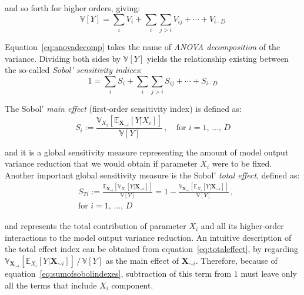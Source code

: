 \noindent
and so forth for higher orders, giving:
%
\begin{equation}\label{eq:anovadecomp}
    \mathbb{V}[Y] = \sum_{i}V_{i} + \sum_{i}\sum_{j>i}V_{ij} + \cdots + V_{i\cdots D}
\end{equation}

\noindent
Equation~\eqref{eq:anovadecomp} takes the name of \textit{ANOVA decomposition} of the variance. Dividing both sides by $\mathbb{V}[Y]$ yields the relationship existing between the so-called \textit{Sobol' sensitivity indices}:
%
\begin{equation}\label{eq:sumofsobolindexes}
    1 = \sum_{i}S_{i} + \sum_{i}\sum_{j>i}S_{ij} + \cdots + S_{i\cdots D}
\end{equation}

\noindent
The Sobol' \textit{main effect} (first-order sensitivity index) is defined as:
%
\begin{equation}\label{eq:maineffect}
    S_{i} := \frac{\mathbb{V}_{X_i}[\mathbb{E}_{\mathbf{X}_{\sim i}}[Y|X_i]]}{\mathbb{V}[Y]}\,,\quad\text{for}\,\,i=1,\,\dots,\,D
\end{equation}

\noindent
and it is a global sensitivity measure representing the amount of model output variance reduction that we would obtain if parameter $X_i$ were to be fixed. Another important global sensitivity measure is the Sobol' \textit{total effect}, defined as:
%
\begin{align}\label{eq:totaleffect}
    & S_{Ti} := \frac{\mathbb{E}_{\mathbf{X}_{\sim i}}[\mathbb{V}_{X_i}[Y|\mathbf{X}_{\sim i}]]}{\mathbb{V}[Y]} = 1 - \frac{\mathbb{V}_{\mathbf{X}_{\sim i}}[\mathbb{E}_{X_i}[Y|\mathbf{X}_{\sim i}]]}{\mathbb{V}[Y]}\,, \\
    & \text{for}\,\,i=1,\,\dots,\,D
\end{align}

\noindent
and represents the total contribution of parameter $X_i$ and all its higher-order interactions to the model output variance reduction. An intuitive description of the total effect index can be obtained from equation~\eqref{eq:totaleffect}, by regarding $\mathbb{V}_{\mathbf{X}_{\sim i}}[\mathbb{E}_{X_i}[Y|\mathbf{X}_{\sim i}]]\,/\,\mathbb{V}[Y]$ as the main effect of $\mathbf{X}_{\sim i}$. Therefore, because of equation~\eqref{eq:sumofsobolindexes}, subtraction of this term from $1$ must leave only all the terms that include $X_i$ component.

%
%
%
